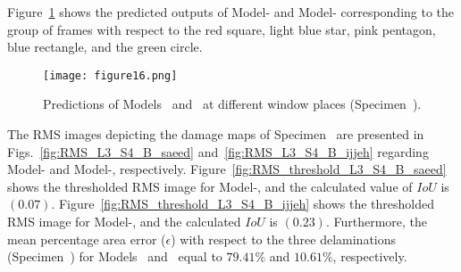 Figure~\ref{fig:L3_S4_B_5HC_predictions} shows the predicted outputs of Model- and Model- corresponding to the group of frames with respect to the red square, light blue star, pink pentagon, blue rectangle, and the green circle. 
\begin{figure}[!h]
	\centering
	\texttt{[image: figure16.png]}
	\caption{Predictions of Models~ and~ at different window places (Specimen~).}
	\label{fig:L3_S4_B_5HC_predictions}
\end{figure}

The RMS images depicting the damage maps of Specimen~ are presented in Figs.~\ref{fig:RMS_L3_S4_B_saeed} and~\ref{fig:RMS_L3_S4_B_ijjeh} regarding Model- and Model-, respectively.
Figure~\ref{fig:RMS_threshold_L3_S4_B_saeed} shows the thresholded RMS image for Model-, and the calculated value of \(IoU\) is \((0.07)\).
Figure~\ref{fig:RMS_threshold_L3_S4_B_ijjeh}  shows the thresholded RMS image for Model-, and the calculated \(IoU\) is \((0.23)\).
Furthermore, the mean percentage area error (\(\epsilon\)) with respect to the three delaminations (Specimen~) for Models~ and~ equal to \(79.41\%\) and \(10.61\%\), respectively.

